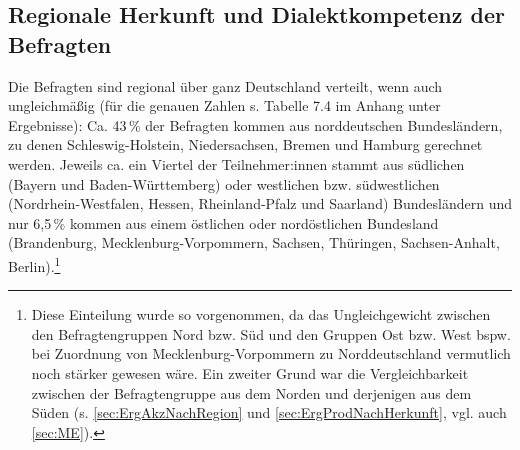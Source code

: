 
\subsection{Regionale Herkunft und Dialektkompetenz der Befragten}
\label{sec:HerkunftundDialekt}
Die Befragten sind regional über ganz Deutschland verteilt, wenn auch ungleichmäßig (für die genauen Zahlen s. Tabelle 7.4 im Anhang unter Ergebnisse): 
Ca. 43\,\% der Befragten kommen aus norddeutschen Bundesländern, zu denen Schleswig\hyp Holstein, Niedersachsen, Bremen und Hamburg gerechnet werden. 
Jeweils ca. ein Viertel der Teilnehmer:innen stammt aus südlichen (Bayern und Baden\hyp Württemberg) oder westlichen bzw. südwestlichen (Nordrhein\hyp Westfalen, Hessen, Rheinland\hyp Pfalz und Saarland) Bundesländern und nur 6,5\,\% kommen aus einem östlichen oder nordöstlichen Bundesland (Brandenburg, Mecklenburg\hyp Vorpommern, Sachsen, Thüringen, Sachsen\hyp Anhalt, Berlin).\footnote{Diese Einteilung wurde so vorgenommen, da das Ungleichgewicht zwischen den Befragtengruppen Nord bzw. Süd und den Gruppen Ost bzw. West bspw. bei Zuordnung von Mecklenburg-Vorpommern zu Norddeutschland vermutlich noch stärker gewesen wäre.
Ein zweiter Grund war die Vergleichbarkeit zwischen der Befragtengruppe aus dem Norden und derjenigen aus dem Süden (s. \autoref{sec:ErgAkzNachRegion} und \autoref{sec:ErgProdNachHerkunft}, vgl. auch \autoref{sec:ME}).}

